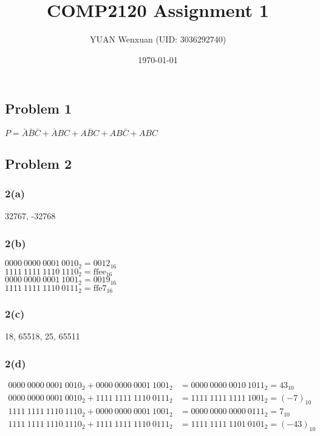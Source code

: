 \documentclass{article}
\title{COMP2120 Assignment 1}
\author{YUAN Wenxuan (UID: 3036292740)}
\date{\today}
\begin{document}
\maketitle

\subsection*{Problem 1}
$P = \bar{A}\bar{B}\bar{C} + \bar{A}BC + A\bar{B}C + AB\bar{C} + ABC$


\subsection*{Problem 2}
\subsubsection*{2(a)}
32767, -32768
\subsubsection*{2(b)}
$0000\ 0000\ 0001\ 0010_{2} = \text{0012} _{16}$  \\
$1111\ 1111\ 1110\ 1110_{2} = \text{ffee} _{16}$  \\
$0000\ 0000\ 0001\ 1001_{2} = \text{0019} _{16}$  \\
$1111\ 1111\ 1110\ 0111_{2} = \text{ffe7} _{16}$
\subsubsection*{2(c)}
18, 65518, 25, 65511
\subsubsection*{2(d)}
\begin{align*}
    0000\ 0000\ 0001\ 0010_{2} + 0000\ 0000\ 0001\ 1001_{2} & = 0000\ 0000\ 0010\ 1011_{2} = 43_{10}    \\
    0000\ 0000\ 0001\ 0010_{2} + 1111\ 1111\ 1110\ 0111_{2} & = 1111\ 1111\ 1111\ 1001_{2} = (-7)_{10}  \\
    1111\ 1111\ 1110\ 1110_{2} + 0000\ 0000\ 0001\ 1001_{2} & = 0000\ 0000\ 0000\ 0111_{2} = 7_{10}     \\
    1111\ 1111\ 1110\ 1110_{2} + 1111\ 1111\ 1110\ 0111_{2} & = 1111\ 1111\ 1101\ 0101_{2} = (-43)_{10}
\end{align*}


\newpage
\end{document}
